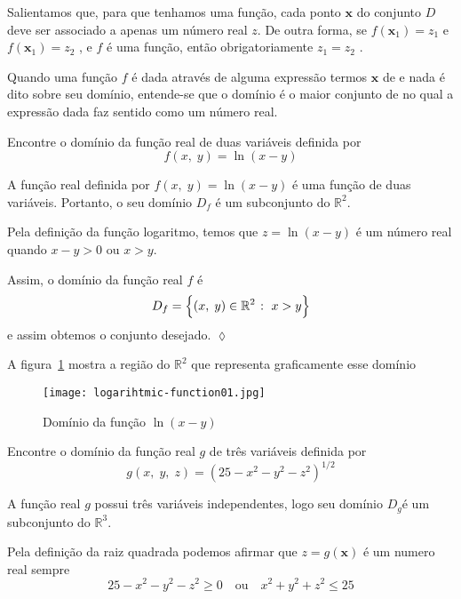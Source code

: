 Salientamos que, para que tenhamos uma função, cada ponto \(\mathbf{x}\)
do conjunto \(D\) deve ser associado a apenas um número real \(z\).  De outra forma, se 
\(f(\mathbf{x}_{1}) = z_{1}\) e \(f(\mathbf{x}_{1}) = z_{2}\) , e \(f\) é uma função, então obrigatoriamente \(z_{1} = z_{2}\) .

Quando uma função \(f\) é dada através de alguma expressão termos \(\mathbf{x}\) de e nada é dito 
sobre seu domínio, entende-se que o domínio  é o maior conjunto de no qual a expressão dada faz
sentido como um número real.

\begin{exer}\label{exe:1-2-1}
	Encontre  o domínio da função real de duas variáveis definida por 
	\begin{equation*}
		f(x,\; y)= \ln(x-y)
	\end{equation*}
\end{exer}

\solo
A função real definida por \(f(x,\; y)= \ln(x-y)\)  é uma função de duas variáveis. Portanto, o seu domínio \(D_{f}\) é um subconjunto do \(\mathbb{R}^{2}\).

Pela definição da função logaritmo, temos que \(z=\ln(x-y)\) é um número real quando \(x-y>0\) ou
\(x>y\).

Assim, o domínio da função real \(f\) é 
\begin{equation*}
	D_{f} =\Bigl\{(x,\;y)\in \mathbb{R}^{2}\; \colon \; x>y \Bigr\}
\end{equation*}
e assim obtemos o conjunto desejado. \hfill \(\lozenge\)

A figura~\ref{fig:1-5} mostra a região do \(\mathbb{R}^{2}\) que representa graficamente esse domínio
\begin{figure}[H]
	\centering
	\texttt{[image: logarihtmic-function01.jpg]}
	\caption{Domínio da função \(\ln(x-y)\)}
	\label{fig:1-5}
\end{figure}

\begin{exer}\label{exe:1-3-1}
	Encontre o domínio da função real \(g\) de três variáveis definida por 
	\begin{equation*}
		g(x,\; y,\; z)= (25-x^{2}-y^{2}-z^{2})^{1/2}
	\end{equation*}
\end{exer}

\solo
A função real \(g\) possui  três variáveis independentes, logo seu domínio \(D_{g}\)é um subconjunto do \(\mathbb{R}^{3}\).

Pela definição da raiz quadrada podemos afirmar que \(z=g(\mathbf{x})\) é um numero real sempre 
\begin{equation*}
	25-x^{2}-y^{2}-z^{2} \geq 0  \quad \text{ou}\quad  x^{2}+y^{2}+z^{2} \leq 25
\end{equation*}

